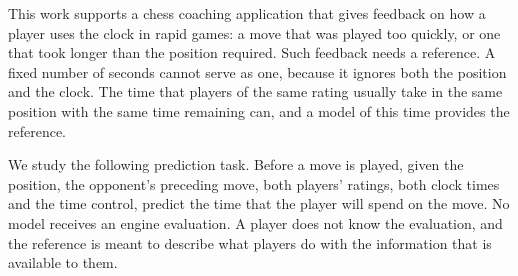 \documentclass[11pt]{article}
\begin{document}
This work supports a chess coaching application that gives feedback on how a
player uses the clock in rapid games: a move that was played too quickly, or
one that took longer than the position required. Such feedback needs a
reference. A fixed number of seconds cannot serve as one, because it ignores
both the position and the clock. The time that players of the same rating
usually take in the same position with the same time remaining can, and a
model of this time provides the reference.

We study the following prediction task. Before a move is played, given the
position, the opponent's preceding move, both players' ratings, both clock
times and the time control, predict the time that the player will spend on
the move. No model receives an engine evaluation. A player does not know the
evaluation, and the reference is meant to describe what players do with the
information that is available to them.
\end{document}
